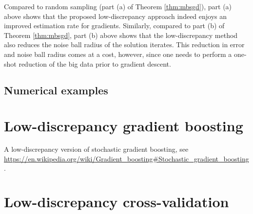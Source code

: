 \documentclass[12pt]{article}
\begin{document}
Compared to random sampling (part (a) of Theorem \ref{thm:mbsgd}), part (a) above shows that the proposed low-discrepancy approach indeed enjoys an improved estimation rate for gradients. Similarly, compared to part (b) of Theorem \ref{thm:mbsgd}, part (b) above shows that the low-discrepancy method also reduces the noise ball radius of the solution iterates. This reduction in error and noise ball radius comes at a cost, however, since one needs to perform a one-shot reduction of the big data prior to gradient descent.

\subsection{Numerical examples}

\section{Low-discrepancy gradient boosting}

A low-discrepancy version of stochastic gradient boosting, see \url{https://en.wikipedia.org/wiki/Gradient_boosting#Stochastic_gradient_boosting}.

\section{Low-discrepancy cross-validation}




%
%




%
%
%
\end{document}
